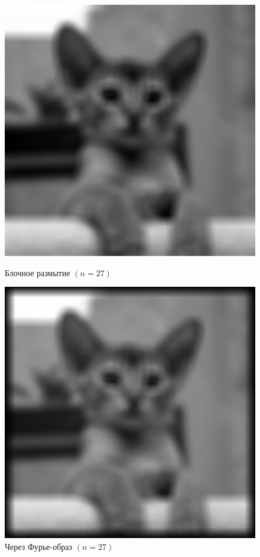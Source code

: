 \documentclass[a4paper]{article}
\begin{document}
\begin{figure}[H]
    \hspace{5em}
    \begin{minipage}{0.35\textwidth}
        \includegraphics[width=\textwidth]{sources/2second/block_27.png}
        \caption{Блочное размытие $(n = 27)$}
    \end{minipage}\hfill
    \begin{minipage}{0.35\textwidth}
        \includegraphics[width=\textwidth]{sources/2second/block_fft_27.png}
        \caption{Через Фурье-образ $(n = 27)$}
    \end{minipage}
    \hspace{5em}
\end{figure}
\end{document}
